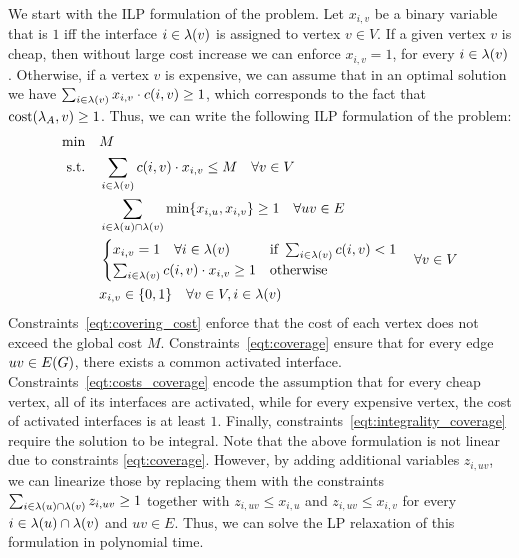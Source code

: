 We start with the ILP formulation of the \coverage problem. Let $x_{i, v}$ be a binary variable that is $1$ iff the interface $i\in\lambda\mathopen{}\left( v \right)$ is assigned to vertex $v\in V$. If a given vertex $v$ is cheap, then without large cost increase we can enforce $x_{i, v}=1$, for every $i\in\lambda\mathopen{}\left( v \right)$. Otherwise, if a vertex $v$ is expensive, we can assume that in an optimal solution we have $\sum_{i\in \lambda\mathopen{}\left( v \right)} x_{i, v}\cdot c\mathopen{}\left( i, v \right) \geq 1$, which corresponds to the fact that $\textnormal{cost}\mathopen{}\left( \lambda_A, v \right)\geq 1$. Thus, we can write the following ILP formulation of the \coverage problem:
\begin{align}
    \text{min} \quad & M \nonumber\\
    \text{s.t.} \quad & \sum_{i\in\lambda\mathopen{}\left( v \right)}c\mathopen{}\left( i, v \right)\cdot x_{i, v} \leq M \quad \forall v\in V \label{eqt:covering_cost}\\
    & \sum_{i\in\lambda\mathopen{}\left( u \right)\cap\lambda\mathopen{}\left( v \right)}\min\mathopen{}\left\{ x_{i, u}, x_{i, v} \right\} \geq 1 \quad \forall uv\in E \label{eqt:coverage}\\
    &\begin{cases}
         x_{i, v} = 1 \quad \forall i\in\lambda\mathopen{}\left( v \right) & \text{if } \sum_{i\in \lambda\mathopen{}\left( v \right)} c\mathopen{}\left( i, v \right) < 1\\
        \sum_{i\in \lambda\mathopen{}\left( v \right)} c\mathopen{}\left( i, v \right)\cdot x_{i, v} \geq 1 & \text{otherwise}
    \end{cases}\quad \forall v\in V \label{eqt:costs_coverage}\\
    & x_{i, v} \in \{0, 1\} \quad \forall v\in V, i\in\lambda\mathopen{}\left( v \right) \label{eqt:integrality_coverage}
\end{align}
Constraints~\eqref{eqt:covering_cost} enforce that the cost of each vertex does not exceed the global cost $M$. Constraints~\eqref{eqt:coverage} ensure that for every edge $uv\in E\mathopen{}\left( G \right)$, there exists a common activated interface. Constraints~\eqref{eqt:costs_coverage} encode the assumption that for every cheap vertex, all of its interfaces are activated, while for every expensive vertex, the cost of activated interfaces is at least $1$. Finally, constraints~\eqref{eqt:integrality_coverage} require the solution to be integral.
Note that the above formulation is not linear due to constraints \eqref{eqt:coverage}. However, by adding additional variables $z_{i, uv}$, we can linearize those by replacing them with the constraints $\sum_{i\in\lambda\mathopen{}\left( u \right)\cap\lambda\mathopen{}\left( v \right)}z_{i, uv} \geq 1$ together with $z_{i, uv} \leq x_{i, u}$ and $z_{i, uv} \leq x_{i, v}$ for every $i\in\lambda\mathopen{}\left( u \right)\cap\lambda\mathopen{}\left( v \right)$ and $uv\in E$. Thus, we can solve the LP relaxation of this formulation in polynomial time.

